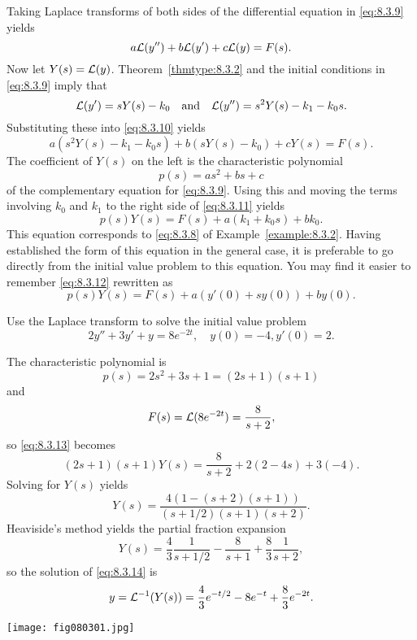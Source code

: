 \documentclass{ximera}
\begin{document}
Taking Laplace transforms of both sides of  the differential
equation in \eqref{eq:8.3.9} yields
\begin{equation}\label{eq:8.3.10}
a{\cal L}(y'')+b{\cal L}(y')+c{\cal L}(y)=F(s).
\end{equation}
Now let $Y(s)={\cal L}(y)$.  Theorem~\ref{thmtype:8.3.2} and the
initial conditions in \eqref{eq:8.3.9} imply that
$$
{\cal L}(y')=sY(s)-k_0\quad\mbox{and}\quad {\cal L}(y'')=s^2Y(s)-k_1-k_0s.
$$
Substituting these  into  \eqref{eq:8.3.10} yields
\begin{equation}\label{eq:8.3.11}
a\left(s^2Y(s)-k_1-k_0s\right)+b\left(sY(s)-k_0\right)+cY(s)=F(s).
\end{equation}
The coefficient of $Y(s)$ on the left is the characteristic
polynomial
$$
p(s)=as^2+bs+c
$$
of the complementary equation for \eqref{eq:8.3.9}. Using this and moving
the terms involving $k_0$ and $k_1$ to the right side of \eqref{eq:8.3.11}
yields
\begin{equation}\label{eq:8.3.12}
p(s)Y(s)=F(s)+a(k_1+k_0s)+bk_0.
\end{equation}
This equation corresponds to \eqref{eq:8.3.8} of Example~\ref{example:8.3.2}.
Having established the form of this equation in the general case, it
is preferable to go directly from the initial value problem to this
equation. You may find it easier to remember \eqref{eq:8.3.12} rewritten
as
\begin{equation} \label{eq:8.3.13}
p(s)Y(s)=F(s)+a\left(y'(0)+sy(0)\right)+by(0).
\end{equation}

\begin{example}\label{example:8.3.3}
 Use the Laplace transform to solve the
initial value problem
\begin{equation}\label{eq:8.3.14}
2y''+3y'+y=8e^{-2t}, \quad   y(0)=-4,  y'(0)=2.
\end{equation}

\begin{explanation}
The characteristic polynomial is
$$
p(s)=2s^2+3s+1=(2s+1)(s+1)
$$
 and
$$
F(s)={\cal L}(8e^{-2t})=\frac{8}{s+2},
$$
so \eqref{eq:8.3.13} becomes
$$
(2s+1)(s+1)Y(s)=\frac{8}{s+2}+2(2-4s)+3(-4).
$$
Solving  for $Y(s)$ yields
$$
Y(s)=\frac{4\left(1-(s+2)(s+1)\right)}{(s+1/2)(s+1)(s+2)}.
$$
Heaviside's method yields the partial fraction expansion
$$
Y(s)=\frac{4}{3}\frac{1}{s+1/2}-\frac{8}{s+1}+\frac{8}{3}\frac{1}{s+2},
$$
so the solution of  \eqref{eq:8.3.14} is
$$
y={\cal L}^{-1}(Y(s))=\frac{4}{3}e^{-t/2}-8e^{-t}+\frac{8}{3}e^{-2t}.
$$

\begin{image}
 \texttt{[image: fig080301.jpg]}
 \end{image}
\end{explanation}
\end{example}
\end{document}
